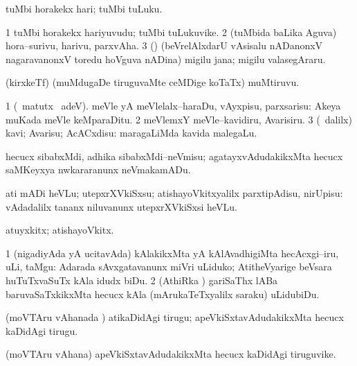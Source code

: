 \bentry
{}
\gl{\sakirx}
\bmng
tuMbi horakekx hari; tuMbi tuLuku. 
\emng
\eentry


\bentry
{}
\gl{\nA}
\bmng
\bnum
\num{1} tuMbi horakekx hariyuvudu; tuMbi tuLukuvike. 
\num{2} (tuMbida baLika Aguva) hora--surivu, harivu, parxvAha. 
\num{3} (\rUpa) (beVrelAlxdarU vAsisalu nADanonxV nagaravanonxV toredu hoVguva nADina) migilu jana; migilu valasegAraru. 
\enum
\emng
\eentry


\bentry
{}
\gl{\nA}
\bmng
(kirxkeTf) (muMdugaDe tiruguvaMte ceMDige koTaTx) muMtiruvu. 
\emng
\eentry


\bentry
{}
\gl{\sakirx}
\bmng
\bnum
\num{1} (\BU\ matutx \BUkaq\ adeV). meVle yA meVlelalx--haraDu, vAyxpisu, parxsarisu:  Akeya muKada meVle keMparaDitu. 
\num{2} meVlemxY meVle--kavidiru, Avarisiru. 
\num{3} (\kanmu\ \BUkaq dalilx) kavi; Avarisu; AcACxdisu:  maragaLiMda kavida malegaLu. 
\enum
\emng
\eentry


\bentry
{}
\gl{\sakirx}
\bmng
hecucx sibabxMdi, adhika sibabxMdi--neVmisu; agatayxvAdudakikxMta hecucx saMKeyxya nwkararanunx neVmakamADu. 
\emng
\eentry


\bentry
{}
\gl{\sakirx}
\bmng
ati mADi heVLu; utepxrXVkiSxsu; atishayoVkitxyalilx parxtipAdisu, nirUpisu:  vAdadalilx tananx niluvanunx utepxrXVkiSxsi heVLu. 
\emng
\eentry


\bentry
{}
\gl{\nA}
\bmng
atuyxkitx; atishayoVkitx. 
\emng
\eentry


\bentry
{}
\gl{\sakirx}
\bmng
\bnum
\num{1} (nigadiyAda yA ucitavAda) kAlakikxMta yA kAlAvadhigiMta hecAcxgi--iru, uLi, taMgu:  Adarada sAvxgatavanunx miVri uLiduko; AtitheVyarige beVsara huTuTxvaSuTx kAla idudx biDu. 
\num{2} (AthiRka \vi) gariSaThx lABa baruvaSaTxkikxMta hecucx kAla (mArukaTeTxyalilx saraku) uLidubiDu. 
\enum
\emng
\eentry


\bentry
{}
\gl{\akirx}
\bmng
(moVTAru vAhanada \vi) atikaDidAgi tirugu; apeVkiSxtavAdudakikxMta hecucx kaDidAgi tirugu. 
\emng
\eentry


\bentry
{}
\gl{\nA}
\bmng
(moVTAru vAhana) apeVkiSxtavAdudakikxMta hecucx kaDidAgi tiruguvike. 
\emng
\eentry



